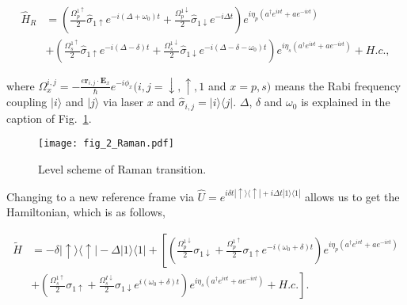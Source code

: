 \begin{equation}
    \begin{aligned}
        \label{Raman interaction H}
        \hat{H}_{R} & =\left(\frac{\Omega_p^{1\uparrow}}{2}\hat{\sigma}_{1\uparrow}e^{-i(\Delta+\omega_0)t}+\frac{\Omega_p^{1\downarrow}}{2}\hat{\sigma}_{1\downarrow}e^{-i\Delta t}\right)e^{i\eta_p(a^\dag e^{i\nu t}+ae^{-i\nu t})} \\&+\left(\frac{\Omega_s^{1\uparrow}}{2}\hat{\sigma}_{1\uparrow}e^{-i(\Delta-\delta)t}+\frac{\Omega_s^{1\downarrow}}{2}\hat{\sigma}_{1\downarrow}e^{-i(\Delta-\delta-\omega_0) t}\right)e^{i\eta_s(a^\dag e^{i\nu t}+ae^{-i\nu t})}+H.c.,
    \end{aligned}
\end{equation}

where $\Omega_x^{i, j}=-\frac{e \mathbf{r}_{i, j} \cdot \mathbf{E}_x}{\hbar} e^{-i \phi_x}(i, j=\downarrow, \uparrow, 1$ and $x=p, s)$ means the Rabi frequency coupling $|i\rangle$ and $|j\rangle$ via laser $x$ and $\hat{\sigma}_{i, j}=|i\rangle\langle j|$. $\Delta$, $\delta$ and $\omega_0$ is explained in the caption of Fig.~\ref{fig:Raman}.

\begin{figure}
    \centering
    \texttt{[image: fig\_2\_Raman.pdf]}
    \caption{Level scheme of Raman transition.}
    \label{fig:Raman}
\end{figure}

Changing to a new reference frame via $\hat{U}=e^{i \delta t|\uparrow\rangle\langle\uparrow|+i \Delta t| 1\rangle\langle 1|}$ allows us to get the Hamiltonian, which is as follows,

\begin{equation}
    \begin{aligned}
        \widetilde{H} & =-\delta|\uparrow\rangle\langle\uparrow|-\Delta| 1\rangle\langle 1|+\left[\left(\frac{\Omega_p^{1 \downarrow}}{2} \sigma_{1 \downarrow}+\frac{\Omega_p^{1 \uparrow}}{2} \sigma_{1 \uparrow} e^{-i\left(\omega_0+\delta\right) t}\right) e^{i \eta_p\left(a^{\dagger} e^{i v t}+a e^{-i v t}\right)}\right. \\
                      & \left.+\left(\frac{\Omega_s^{1 \uparrow}}{2} \sigma_{1 \uparrow}+\frac{\Omega_s^{I \downarrow}}{2} \sigma_{1 \downarrow} e^{i\left(\omega_0+\delta\right) t}\right) e^{i \eta_s\left(a^{\dagger} e^{i v t}+a e^{-i v t}\right)}+H . c .\right] .
    \end{aligned}
\end{equation}

